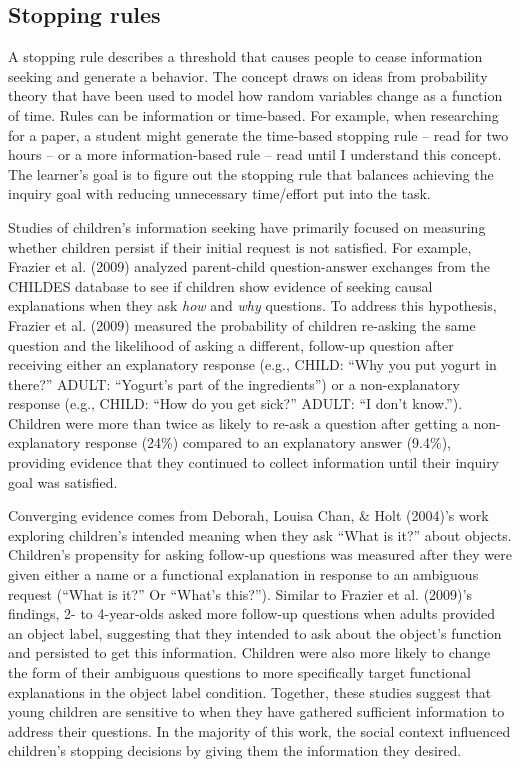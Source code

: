 \documentclass[oneside]{report}
\begin{document}
\hypertarget{stopping-rules}{%
\subsection{Stopping rules}\label{stopping-rules}}

A stopping rule describes a threshold that causes people to cease
information seeking and generate a behavior. The concept draws on ideas
from probability theory that have been used to model how random
variables change as a function of time. Rules can be information or
time-based. For example, when researching for a paper, a student might
generate the time-based stopping rule -- read for two hours -- or a more
information-based rule -- read until I understand this concept. The
learner's goal is to figure out the stopping rule that balances
achieving the inquiry goal with reducing unnecessary time/effort put
into the task.

Studies of children's information seeking have primarily focused on
measuring whether children persist if their initial request is not
satisfied. For example, Frazier et al. (2009) analyzed parent-child
question-answer exchanges from the CHILDES database to see if children
show evidence of seeking causal explanations when they ask \emph{how}
and \emph{why} questions. To address this hypothesis, Frazier et al.
(2009) measured the probability of children re-asking the same question
and the likelihood of asking a different, follow-up question after
receiving either an explanatory response (e.g., CHILD: ``Why you put
yogurt in there?'' ADULT: ``Yogurt's part of the ingredients'') or a
non-explanatory response (e.g., CHILD: ``How do you get sick?'' ADULT:
``I don't know.''). Children were more than twice as likely to re-ask a
question after getting a non-explanatory response (24\%) compared to an
explanatory answer (9.4\%), providing evidence that they continued to
collect information until their inquiry goal was satisfied.

Converging evidence comes from Deborah, Louisa Chan, \& Holt (2004)'s
work exploring children's intended meaning when they ask ``What is it?''
about objects. Children's propensity for asking follow-up questions was
measured after they were given either a name or a functional explanation
in response to an ambiguous request (``What is it?'' Or ``What's
this?''). Similar to Frazier et al. (2009)'s findings, 2- to 4-year-olds
asked more follow-up questions when adults provided an object label,
suggesting that they intended to ask about the object's function and
persisted to get this information. Children were also more likely to
change the form of their ambiguous questions to more specifically target
functional explanations in the object label condition. Together, these
studies suggest that young children are sensitive to when they have
gathered sufficient information to address their questions. In the
majority of this work, the social context influenced children's stopping
decisions by giving them the information they desired.
\end{document}
